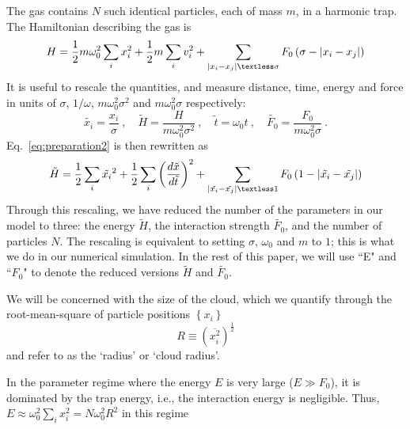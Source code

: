 \documentclass[aps,preprintnumbers,onecolumn,amsmath,amssymb,floatfix,pra]{revtex4-1}
\begin{document}
The gas contains $N$ such identical particles, each of mass $m$, in a harmonic trap.  The
Hamiltonian describing the gas is 
\begin{equation}
H=\frac{1}{2}m\omega_0^2\sum_{i}x_i^2+\frac{1}{2}m\sum_i
v_i^2+\sum_{\left|x_i-x_j\right|\textless\sigma}F_0\left(\sigma-\left|x_i-x_j\right|\right)
\label{eq:preparation2}
\end{equation}
%
It is useful to rescale the quantities, and measure distance, time, energy and force in units of
$\sigma$, $1/\omega$, $m\omega_0^2\sigma^2$ and $m\omega_0^2\sigma$ respectively:
\begin{equation} \label{eq:transform}
  \tilde{x_i} = \frac{x_i}{\sigma}\ , \quad 
  \tilde{H} = \frac{H}{m\omega_0^2\sigma^2}\ ,  \quad \tilde{t} = \omega_0t \ ,  \quad 
\tilde{F_0} = \frac{F_0}{m\omega_0^2\sigma}\ .
\end{equation}
%
Eq.~\ref{eq:preparation2} is then rewritten as
\begin{equation}
\tilde{H}=\frac{1}{2}\sum_{i}\tilde{x_i}^2+\frac{1}{2}\sum_i\left(\frac{d\tilde{x}}{d\tilde{t}}\right)^2+\sum_{\left|\tilde{x_i}-\tilde{x_j}\right|\textless 1}F_0\left(1-\left|\tilde{x_i}-\tilde{x_j}\right|\right)
\end{equation}
%
Through this rescaling, we have reduced the number of the parameters in our model to three: the
energy $\tilde{H}$, the interaction strength $\tilde{F_0}$, and the number of particles $N$.  The
rescaling is equivalent to setting $\sigma$, $\omega_0$ and $m$ to $1$; this is what we do in our
numerical simulation.  In the rest of this paper, we will use ``E" and ``$F_0$" to denote the
reduced versions $\tilde{H}$ and $\tilde{F_0}$.

We will be concerned with the size of the cloud, which we quantify through the root-mean-square of
particle positions  $\left\lbrace x_i\right\rbrace$
\begin{equation}
R\equiv\left(\overline{x_i^2}\right)^\frac{1}{2}
\label{eq:def_of_R}
\end{equation}
and refer to as the `radius' or `cloud radius'. 

In the parameter regime where the energy $E$ is very large ($E\gg F_0$), it is dominated by the trap
energy, i.e., the interaction energy is negligible.  Thus,
$E\approx\omega_0^2\sum_{i}x_i^2=N\omega_0^2R^2$ in this regime
\end{document}
